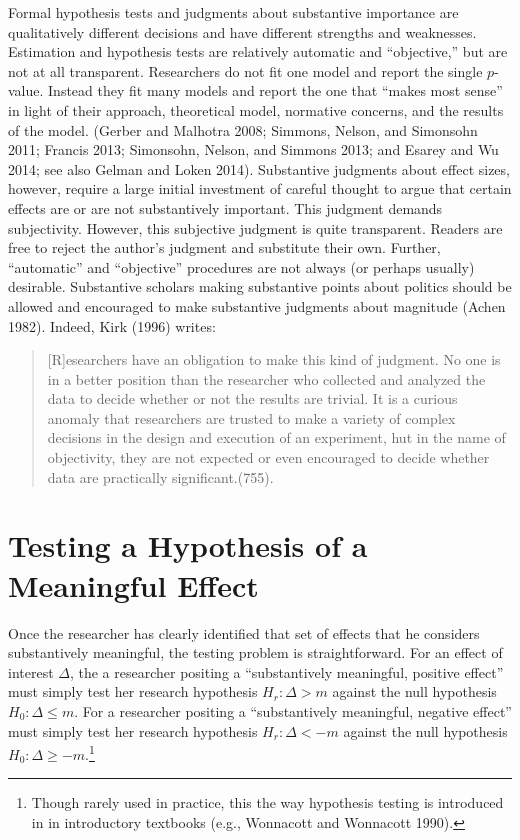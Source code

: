 \documentclass[12pt]{article}
\begin{document}
Formal hypothesis tests and judgments about substantive importance are qualitatively different decisions and have different strengths and weaknesses. Estimation and hypothesis tests are relatively automatic and ``objective,'' but are not at all transparent. Researchers do not fit one model and report the single $p$-value. Instead they fit many models and report the one that ``makes most sense'' in light of their approach, theoretical model, normative concerns, and the results of the model. (Gerber and Malhotra 2008; Simmons, Nelson, and Simonsohn 2011; Francis 2013; Simonsohn, Nelson, and Simmons 2013; and Esarey and Wu 2014; see also Gelman and Loken 2014). Substantive judgments about effect sizes, however, require a large initial investment of careful thought to argue that certain effects are or are not substantively important. This judgment demands subjectivity. However, this subjective judgment is quite transparent. Readers are free to reject the author's judgment and substitute their own. Further, ``automatic'' and ``objective'' procedures are not always (or perhaps usually) desirable. Substantive scholars making substantive points about politics should be allowed and encouraged to make substantive judgments about magnitude (Achen 1982). Indeed, Kirk (1996) writes:

\begin{quote}
[R]esearchers have an obligation to make this kind of judgment. No one is in a better position than the researcher who collected and analyzed the data to decide whether or not the results are trivial. It is a curious anomaly that researchers are trusted to make a variety of complex decisions in the design and execution of an experiment, hut in the name of objectivity, they are not expected or even encouraged to decide whether data are practically significant.(755).
\end{quote}

\section*{Testing a Hypothesis of a Meaningful Effect}

Once the researcher has clearly identified that set of effects that he considers substantively meaningful, the testing problem is straightforward. For an effect of interest $\Delta$, the a researcher positing a ``substantively meaningful, positive effect'' must simply test her research hypothesis $H_r: \Delta > m$ against the null hypothesis $H_0: \Delta \leq m$. For a researcher positing a ``substantively meaningful, negative effect'' must simply test her research hypothesis $H_r: \Delta < -m$ against the null hypothesis $H_0: \Delta \geq -m$.\footnote{Though rarely used in practice, this the way hypothesis testing is introduced in in introductory textbooks (e.g., Wonnacott and Wonnacott 1990).}
\end{document}
